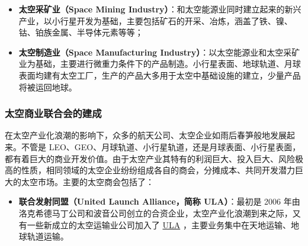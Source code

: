 \documentclass[letterpaper,10pt]{sphinxmanual}
\begin{document}
\begin{itemize}
\item {} 
\textbf{太空采矿业（Space Mining Industry）}：和太空能源业同时建立起来的新兴产业，以小行星开发为基础，主要包括矿石的开采、冶炼，涵盖了铁、镍、钴、铂族金属、半导体元素等等；

\end{itemize}
\begin{figure}[htbp]
\centering
\end{figure}

\begin{itemize}
\item {} 
\textbf{太空制造业（Space Manufacturing Industry）}：以太空能源业和太空采矿业为基础，主要进行微重力条件下的产品制造。小行星表面、地球轨道、月球表面均建有太空工厂，生产的产品大多用于太空中基础设施的建立，少量产品将被运回地球。

\end{itemize}
\begin{figure}[htbp]
\centering
\end{figure}


\subsubsection{太空商业联合会的建成}
\label{history:index-17}\label{history:id8}
在太空产业化浪潮的影响下，众多的航天公司、太空企业如雨后春笋般地发展起来。不管是 LEO、GEO、月球轨道、小行星轨道，还是月球表面、小行星表面，都有着巨大的商业开发价值。由于太空产业其特有的利润巨大、投入巨大、风险极高的性质，相同领域的太空企业纷纷组成各自的商会，分摊成本、共同开发潜力巨大的太空市场。主要的太空商会包括了：

\begin{itemize}
\item {} 
\textbf{联合发射同盟（United Launch Alliance，简称 ULA）}：最初是 2006 年由洛克希德马丁公司和波音公司创立的合资企业，太空产业化浪潮到来之际，又有一些新成立的太空运输业公司加入了 \href{http://en.wikipedia.org/wiki/United\_Launch\_Alliance}{ULA} ，主要业务集中在天地运输、地球轨道运输。

\end{itemize}
\begin{figure}[htbp]
\centering
\end{figure}
\end{document}
